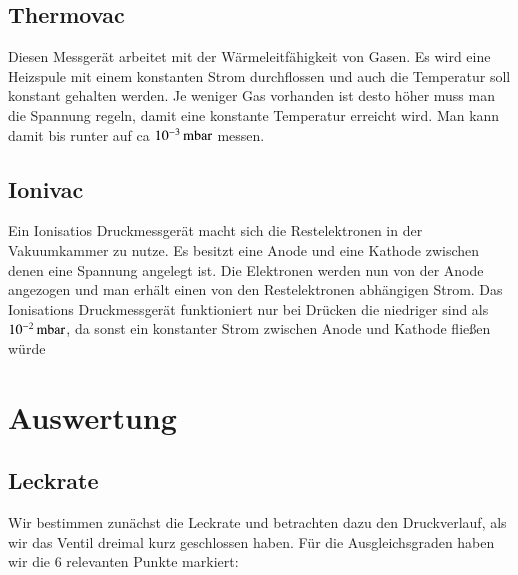 \subsection*{Thermovac}

Diesen Messgerät arbeitet mit der Wärmeleitfähigkeit von Gasen. Es wird eine Heizspule mit einem konstanten Strom durchflossen und auch die Temperatur soll konstant gehalten werden. Je weniger Gas vorhanden ist desto höher muss man die Spannung regeln, damit eine konstante Temperatur erreicht wird. Man kann damit bis runter auf ca $\unit[10^{-3}]{mbar}$ messen.


\subsection*{Ionivac}

Ein Ionisatios Druckmessgerät macht sich die Restelektronen in der Vakuumkammer zu nutze. Es besitzt eine Anode und eine Kathode zwischen denen eine Spannung angelegt ist. Die Elektronen werden nun von der Anode angezogen und man erhält einen von den Restelektronen abhängigen Strom.
Das Ionisations Druckmessgerät funktioniert nur bei Drücken die niedriger sind als $\unit[10^{-2}]{mbar}$, da sonst ein konstanter Strom zwischen Anode und Kathode fließen würde


\section{Auswertung}

\subsection*{Leckrate}

Wir bestimmen zunächst die Leckrate und betrachten dazu den Druckverlauf, als wir das Ventil dreimal kurz geschlossen haben. Für die Ausgleichsgraden haben wir die 6 relevanten Punkte markiert:


